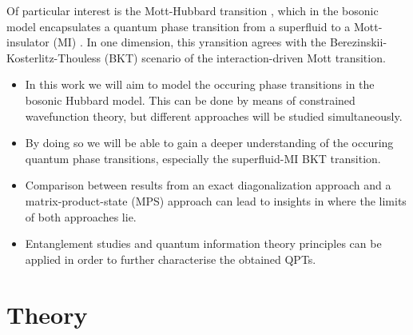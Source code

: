 \documentclass[twoside,twocolumn,9pt]{article}
\begin{document}
Of particular interest is the Mott-Hubbard transition \cite{mott1949}, which in the bosonic model encapsulates a quantum phase transition from a superfluid to a Mott-insulator (MI) \cite{elstner1999, capello2007, cucchietti2007}. In one dimension, this yransition agrees with the Berezinskii-Kosterlitz-Thouless (BKT) \cite{kosterlitz1973} scenario of the interaction-driven Mott transition.

\begin{itemize}
    \item In this work we will aim to model the occuring phase transitions in the bosonic Hubbard model. This can be done by means of constrained wavefunction theory, but different approaches will be studied simultaneously.
    \item By doing so we will be able to gain a deeper understanding of the occuring quantum phase transitions, especially the superfluid-MI BKT transition.
    \item Comparison between results from an exact diagonalization approach \cite{zhang2010} and a matrix-product-state (MPS) \cite{perez2006} approach can lead to insights in where the limits of both approaches lie.
    \item Entanglement studies and quantum information theory principles can be applied in order to further characterise the obtained QPTs.
\end{itemize}

\section{Theory}
\end{document}
